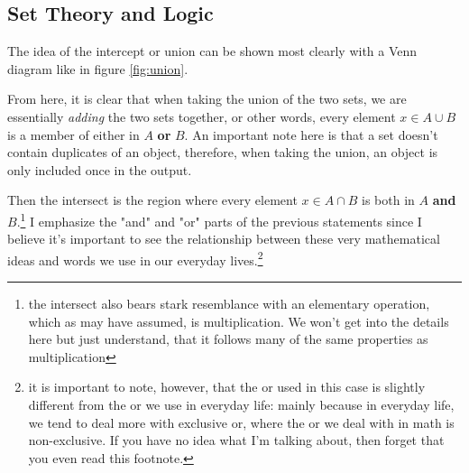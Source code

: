 \documentclass[11pt]{article}
\numberwithin{lemma}{section}
\numberwithin{equation}{section}
\numberwithin{define}{section}
\numberwithin{prop}{section}
\numberwithin{figure}{section}
\numberwithin{theorem}{section}
\newcounter{ex}[section]
\numberwithin{ex}{section}
\begin{document}
\subsection{Set Theory and Logic}
The idea of the intercept or union can be shown most clearly with a Venn diagram like in figure \eqref{fig:union}.
\begin{figure}[h]
\centering
{}
	\caption{}
	\label{fig:union}
\end{figure}
From here, it is clear that when taking the union of the two sets, we are essentially \textit{adding} the two sets together, or other words, every element $x\in A\cup B$ is a member of either in $A$ \textbf{or} $B$.
An important note here is that a set doesn't contain duplicates of an object, therefore, when taking the union, an object is only included once in the output.

Then the intersect is the region where every element $x\in A\cap B$ is both in $A$ \textbf{and} $B$.\footnote{the intersect also bears stark resemblance with an elementary operation, which as may have assumed, is multiplication. 
We won't get into the details here but just understand, that it follows many of the same properties as multiplication}
I emphasize the "and" and "or" parts of the previous statements since I believe it's important to see the relationship between these very mathematical ideas and words we use in our everyday lives.\footnote{
it is important to note, however, that the or used in this case is slightly different from the or we use in everyday life: mainly because in everyday life, we tend to deal more with exclusive or, where the or we deal with in math is non-exclusive. 
If you have no idea what I'm talking about, then forget that you even read this footnote.}
\end{document}

